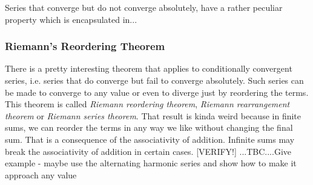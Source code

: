 

Series that converge but do not converge absolutely, have a rather peculiar property which is encapsulated in...






\subsubsection{Riemann's Reordering Theorem} There is a pretty interesting theorem that applies to conditionally convergent series, i.e. series that do converge but fail to converge absolutely. Such series can be made to converge to any value or even to diverge just by reordering the terms. This theorem is called \emph{Riemann reordering theorem}, \emph{Riemann rearrangement theorem} or \emph{Riemann series theorem}. That result is kinda weird because in finite sums, we can reorder the terms in any way we like without changing the final sum. That is a consequence of the associativity of addition. Infinite sums may break the associativity of addition in certain cases. [VERIFY!] ...TBC....Give example - maybe use the alternating harmonic series and show how to make it approach any value



